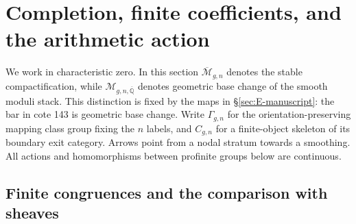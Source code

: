 \section{Completion, finite coefficients, and the arithmetic action}
\label{sec:E}
\label{sec:E-manuscript}

We work in characteristic zero.  In this section $\overline{\mathcal M}_{g,n}$
denotes the stable compactification, while
$\mathcal M_{g,n,\overline{\mathbb Q}}$ denotes geometric base change of
the smooth moduli stack.  This distinction is fixed by the maps in
\S\ref{sec:E-manuscript}: the bar in cote 143 is geometric base change.
Write $\Gamma_{g,n}$ for the orientation-preserving mapping class group
fixing the $n$ labels, and $C_{g,n}$ for a finite-object skeleton of its
boundary exit category.  Arrows point from a nodal stratum towards a
smoothing.  All actions and homomorphisms between profinite groups below
are continuous.

\subsection{Finite congruences and the comparison with sheaves}


